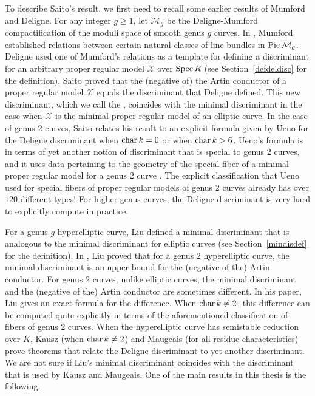 To describe Saito's result, we first need to recall some earlier results of Mumford and Deligne. For any integer $g \geq 1$, let $\overline{\mathcal{M}}_g$ be the Deligne-Mumford compactification of the moduli space of smooth genus $g$ curves. In \cite[Theorem~5.10]{mumford}, Mumford established relations between certain natural classes of line bundles in $\operatorname{Pic} \overline{\mathcal{M}}_g$. Deligne used one of Mumford's relations as a template for defining a discriminant for an arbitrary proper regular model $\mathscr{X}$ over $\operatorname{Spec} R$ (see Section~\ref{defdeldisc} for the definition). Saito proved that the (negative of) the Artin conductor of a proper regular model $\mathscr{X}$ equals the discriminant that Deligne defined. This new discriminant, which we call the {}, coincides with the minimal discriminant in the case when $\mathscr{X}$ is the minimal proper regular model of an elliptic curve. In the case of genus $2$ curves, Saito relates his result to an explicit formula given by Ueno for the Deligne discriminant when $\operatorname{char} k = 0$ or when $\operatorname{char} k > 6$. Ueno's formula is in terms of yet another notion of discriminant that is special to genus $2$ curves, and it uses data pertaining to the geometry of the special fiber of a minimal proper regular model for a genus $2$ curve \cite{ueno}. The explicit classification that Ueno used for special fibers of proper regular models of genus $2$ curves already has over $120$ different types! For higher genus curves, the Deligne discriminant is very hard to explicitly compute in practice.

For a genus $g$ hyperelliptic curve, Liu defined a minimal discriminant that is analogous to the minimal discriminant for elliptic curves (see Section~\ref{mindisdef} for the definition). In \cite{liup}, Liu proved that for a genus $2$ hyperelliptic curve, the minimal discriminant is an upper bound for the (negative of the) Artin conductor. For genus $2$ curves, unlike elliptic curves, the minimal discriminant and the (negative of the) Artin conductor are sometimes different. In his paper, Liu gives an exact formula for the difference. When $\operatorname{char} k \neq 2$, this difference can be computed quite explicitly in terms of the aforementioned classification of fibers of genus $2$ curves. When the hyperelliptic curve has semistable reduction over $K$, Kausz \cite{kausz} (when $\operatorname{char} k \neq 2$) and Maugeais \cite{maugeais} (for all residue characteristics) prove theorems that relate the Deligne discriminant to yet another discriminant. We are not sure if Liu's minimal discriminant coincides with the discriminant that is used by Kausz and Maugeais. One of the main results in this thesis is the following.

